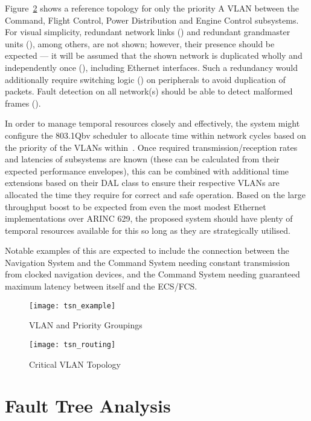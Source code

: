Figure~\ref{fig:topology} shows a reference topology for only the priority A VLAN between the Command, Flight Control, Power Distribution and Engine Control subsystems.
For visual simplicity, redundant network links () and redundant grandmaster units (), among others, are not shown; however, their presence should be expected --- it will be assumed that the shown network is duplicated wholly and independently once (), including Ethernet interfaces.
Such a redundancy would additionally require switching logic () on peripherals to avoid duplication of packets.
Fault detection on all network(s) should be able to detect malformed frames ().

In order to manage temporal resources closely and effectively, the system might configure the 803.1Qbv scheduler to allocate time within network cycles based on the priority of the VLANs within~\cite{IEEEStandardLocal2016a}.
Once required transmission/reception rates and latencies of subsystems are known (these can be calculated from their expected performance envelopes), this can be combined with additional time extensions based on their DAL class to ensure their respective VLANs are allocated the time they require for correct and safe operation.
Based on the large throughput boost to be expected from even the most modest Ethernet implementations over ARINC 629, the proposed system should have plenty of temporal resources available for this so long as they are strategically utilised.

Notable examples of this are expected to include the connection between the Navigation System and the Command System needing constant transmission from clocked navigation devices, and the Command System needing guaranteed maximum latency between itself and the ECS/FCS.

\begin{figure}[H]
\centering
\texttt{[image: tsn\_example]}
\caption{VLAN and Priority Groupings}
\label{fig:vlans}
\end{figure}

\begin{figure}[H]
\centering
\texttt{[image: tsn\_routing]}
\caption{Critical VLAN Topology}
\label{fig:topology}
\end{figure}


\section{Fault Tree Analysis}

